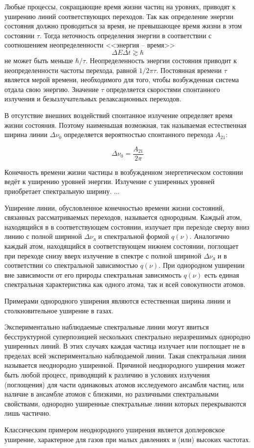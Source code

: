 
Любые процессы, сокращающие время жизни частиц на уровнях, приводят к уширению 
линий соответствующих переходов. Так как определение энергии состояния должно 
проводиться за время, не превышающее время жизни в этом состоянии \( \tau \). 
Тогда неточность определения энергии в соответствии с соотношением 
неопределенности <<энергия -- время>>
\[
	\Delta E \Delta t \gtrsim \hbar
\]
не может быть меньше \( \hbar/\tau \). Неопределенность энергии состояния 
приводит к неопределенности частоты перехода, равной \( 1/2\pi\tau \). 
Постоянная времени \( \tau \) является мерой времени, необходимого для того, 
чтобы возбужденная система отдала свою энергию. Значение \( \tau \) 
определяется скоростями спонтанного излучения и безызлучательных 
релаксационных переходов.

В отсутствие внешних воздействий спонтанное излучение определяет время жизни 
состояния. Поэтому наименьшая возможная, так называемая естественная ширина 
линии \( \Delta\nu_0 \) определяется вероятностью спонтанного перехода 
\( A_{21} \):

\[
	\Delta\nu_0 = \frac{A_{21}}{2\pi}
\]


Конечность времени жизни частицы в возбужденном энергетическом состоянии 
ведёт к уширению уровней энергии. Излучение с уширенных уровней приобретает 
спектральную ширину. ...

Уширение линии, обусловленное конечностью времени жизни состояний, связанных 
рассматриваемых переходов, называется однородным. Каждый атом, находящийся в 
в соответствующем состоянии, излучает при переходе сверху вниз линию с полной 
шириной \( \Delta\nu_\text{л} \) и спектральной формой \( q(\nu) \). 
Аналогично каждый атом, находящийся в соответствующем нижнем состоянии, 
поглощает при переходе снизу вверх излучение в спектре с полной шириной 
\( \Delta\nu_\text{л} \) и в соответствии со спектральной зависимостью 
\( q(\nu) \). При однородном уширении вне зависимости от его природы 
спектральная зависимость \( q(\nu) \) есть единая спектральная характеристика 
как одного атома, так и всей совокупности атомов.

Примерами однородного уширения являются естественная ширина линии и 
столкновительное уширение в газах. 

Экспериментально наблюдаемые спектральные линии могут явиться бесструктурной 
суперпозицией нескольких спектрально неразрешимых однородно уширенных линий. 
В этих случаях каждая частица излучает или поглощает не в пределах всей 
экспериментально наблюдаемой линии. Такая спектральная линия называется 
неоднородно уширенной. Причиной неоднородного уширения может быть любой 
процесс, приводящий к различию в условиях излучения (поглощения) для части 
одинаковых атомов исследуемого ансамбля частиц, или наличие в ансамбле атомов 
с близкими, но различными спектральными свойствами, однородно уширенные 
спектральные линии которых перекрываются лишь частично.

Классическим примером неоднородного уширения является доплеровское уширение, 
характерное для газов при малых давлениях и (или) высоких частотах.